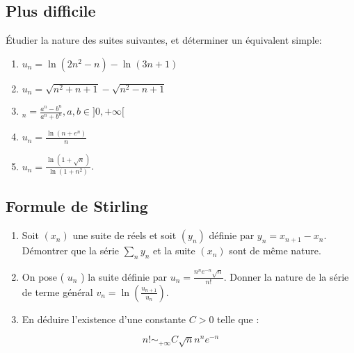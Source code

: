   \vspace{1em}


  \subsection{Plus difficile}
  Étudier la nature des suites suivantes, et déterminer un équivalent simple:
  \begin{multicols}{2}
  \begin{enumerate}[label = \alph*), itemsep = 0.5em]
    \item $u_n=\ln \left(2 n^2-n\right)-\ln (3 n+1)$
    \item $u_n=\sqrt{n^2+n+1}-\sqrt{n^2-n+1}$
    \item $_n=\frac{a^n-b^n}{a^n+b^n}, a, b \in] 0,+\infty[$
    \item $u_n=\frac{\ln \left(n+e^n\right)}{n}$
    \item $u_n=\frac{\ln (1+\sqrt{n})}{\ln \left(1+n^2\right)}$.
  \end{enumerate}
  \end{multicols}

  \vspace{1em}

  \subsection{Formule de Stirling}
  \begin{enumerate}[label = \alph*)]
    \item Soit $\left(x_n\right)$ une suite de réels et soit $\left(y_n\right)$ définie par $y_n=x_{n+1}-x_n$. Démontrer que la série $\sum_n y_n$ et la suite $\left(x_n\right)$ sont de même nature.
    \item On pose ( $u_n$ ) la suite définie par $u_n=\frac{n^n e^{-n} \sqrt{n}}{n!}$. Donner la nature de la série de terme général $v_n=\ln \left(\frac{u_{n+1}}{u_n}\right)$.
    \item En déduire l'existence d'une constante $C>0$ telle que :
  \end{enumerate}
  $$
  n!\sim_{+\infty} C \sqrt{n} n^n e^{-n}
  $$

  \vspace{1em}



